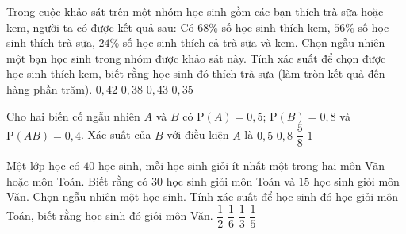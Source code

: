 \begin{ex}%
	Trong cuộc khảo sát trên một nhóm học sinh gồm các bạn thích trà sữa hoặc kem, người ta có được kết quả sau: Có $68\%$ số học sinh thích kem, $56\%$ số học sinh thích trà sữa, $24\%$  số học sinh thích cả trà sữa và kem. Chọn ngẫu nhiên một bạn học sinh trong nhóm được khảo sát này. Tính xác suất để chọn được học sinh thích kem, biết rằng học sinh đó thích trà sữa (làm tròn kết quả đến hàng phần trăm).
	 \choice
		{$0{,}42$} 
		 {$0{,}38$}
		 {\True $0{,}43$}
		 {$0{,}35$}
\end{ex}

\begin{ex}%
	Cho hai biến cố ngẫu nhiên $A$  và $B$ có $\mathrm{P}(A)=0{,}5$; $\mathrm{P}(B)=0{,}8$ và $\mathrm{P}(AB)=0{,}4$. Xác suất của $B$ với điều kiện $A$ là
	 \choice
		{$0{,}5$} 
		 {\True $0{,}8$}
		{$\dfrac{5}{8}$} 
		 {$1$}
\end{ex}

\begin{ex}%
	Một lớp học có $40$ học sinh, mỗi học sinh giỏi ít nhất một trong hai môn Văn hoặc môn Toán. Biết rằng có $30$ học sinh  giỏi môn Toán và $15$ học sinh giỏi môn Văn. Chọn ngẫu nhiên một học sinh. Tính xác suất để học sinh đó học giỏi môn Toán, biết rằng học sinh đó giỏi môn Văn.
	 \choice
		 {$\dfrac{1}{2}$}
		 {$\dfrac{1}{6}$}
		{\True  $\dfrac{1}{3}$}
		 {$\dfrac{1}{5}$}
\end{ex}

